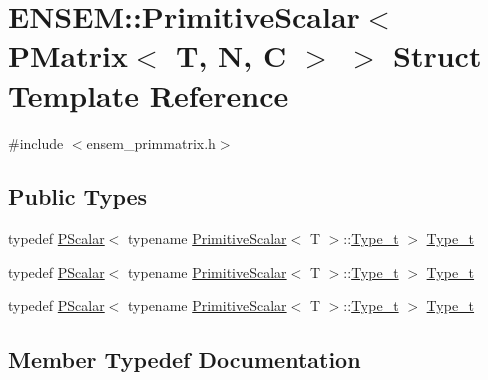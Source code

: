 \hypertarget{structENSEM_1_1PrimitiveScalar_3_01PMatrix_3_01T_00_01N_00_01C_01_4_01_4}{}\section{E\+N\+S\+EM\+:\+:Primitive\+Scalar$<$ P\+Matrix$<$ T, N, C $>$ $>$ Struct Template Reference}
\label{structENSEM_1_1PrimitiveScalar_3_01PMatrix_3_01T_00_01N_00_01C_01_4_01_4}


{\ttfamily \#include $<$ensem\+\_\+primmatrix.\+h$>$}

\subsection*{Public Types}
\begin{DoxyCompactItemize}
\item 
typedef \mbox{\hyperlink{classENSEM_1_1PScalar}{P\+Scalar}}$<$ typename \mbox{\hyperlink{structENSEM_1_1PrimitiveScalar}{Primitive\+Scalar}}$<$ T $>$\+::\mbox{\hyperlink{structENSEM_1_1PrimitiveScalar_3_01PMatrix_3_01T_00_01N_00_01C_01_4_01_4_a86d4d1fddfae8c6be655a4b763d59f64}{Type\+\_\+t}} $>$ \mbox{\hyperlink{structENSEM_1_1PrimitiveScalar_3_01PMatrix_3_01T_00_01N_00_01C_01_4_01_4_a86d4d1fddfae8c6be655a4b763d59f64}{Type\+\_\+t}}
\item 
typedef \mbox{\hyperlink{classENSEM_1_1PScalar}{P\+Scalar}}$<$ typename \mbox{\hyperlink{structENSEM_1_1PrimitiveScalar}{Primitive\+Scalar}}$<$ T $>$\+::\mbox{\hyperlink{structENSEM_1_1PrimitiveScalar_3_01PMatrix_3_01T_00_01N_00_01C_01_4_01_4_a86d4d1fddfae8c6be655a4b763d59f64}{Type\+\_\+t}} $>$ \mbox{\hyperlink{structENSEM_1_1PrimitiveScalar_3_01PMatrix_3_01T_00_01N_00_01C_01_4_01_4_a86d4d1fddfae8c6be655a4b763d59f64}{Type\+\_\+t}}
\item 
typedef \mbox{\hyperlink{classENSEM_1_1PScalar}{P\+Scalar}}$<$ typename \mbox{\hyperlink{structENSEM_1_1PrimitiveScalar}{Primitive\+Scalar}}$<$ T $>$\+::\mbox{\hyperlink{structENSEM_1_1PrimitiveScalar_3_01PMatrix_3_01T_00_01N_00_01C_01_4_01_4_a86d4d1fddfae8c6be655a4b763d59f64}{Type\+\_\+t}} $>$ \mbox{\hyperlink{structENSEM_1_1PrimitiveScalar_3_01PMatrix_3_01T_00_01N_00_01C_01_4_01_4_a86d4d1fddfae8c6be655a4b763d59f64}{Type\+\_\+t}}
\end{DoxyCompactItemize}


\subsection{Member Typedef Documentation}
\mbox{\label{structENSEM_1_1PrimitiveScalar_3_01PMatrix_3_01T_00_01N_00_01C_01_4_01_4_a86d4d1fddfae8c6be655a4b763d59f64}} 
